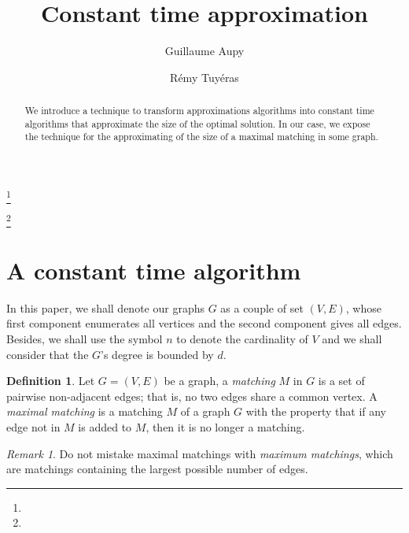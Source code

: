 \documentclass{jams-l}
\theoremstyle{definition}
\newtheorem{definition}[theorem]{Definition}
\theoremstyle{remark}
\newtheorem{remark}[theorem]{Remark}
\numberwithin{equation}{section}
\begin{document}
\title{\textbf{Constant time approximation}}


\author{Guillaume Aupy}
\address{}
\curraddr{}
\email{}
\thanks{}

\author{R\'{e}my Tuy\'{e}ras}
\address{}
\curraddr{}
\email{}
\thanks{}


\date{}

\dedicatory{}

\begin{abstract}
We introduce a technique to transform approximations algorithms
into constant time algorithms that approximate the size of the optimal solution. 
In our case, we expose the technique for the approximating of the size 
of a maximal matching in some graph.

\end{abstract}

\maketitle

\section{A constant time algorithm}

In this paper, we shall denote our graphs $G$ as a couple of set $(V,E)$, whose first
component enumerates all vertices and the second component gives all edges. Besides,
we shall use the symbol $n$ to denote the cardinality of $V$ and we shall consider 
that the $G$'s degree is bounded by $d$.

\begin{definition}
Let $G = (V,E)$ be a graph, a \emph{matching} $M$ in $G$ is a set of pairwise non-adjacent
edges; that is, no two edges share a common vertex. A \emph{maximal matching} is a matching $M$
of a graph $G$ with the property that if any edge not in $M$ is added to $M$, then it is no longer a matching.
\end{definition}

\begin{remark}
Do not mistake maximal matchings with \emph{maximum matchings}, which are matchings containing the largest possible number of edges.
\end{remark}
\end{document}
